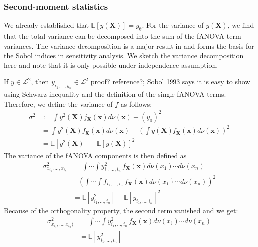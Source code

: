 \subsubsection*{Second-moment statistics}
We already established that $\mathbb{E}[y(\boldsymbol{X})] = y_{\emptyset}$.
For the variance of $y(\boldsymbol{X})$, we find that the total variance can be decomposed into the sum of the fANOVA term variances. The variance decomposition is a major result in \cite{sobol1993sensitivity} and forms the basis for the Sobol indices in sensitivity analysis. We sketch the variance decomposition here and note that it is only possible under independence assumption.\par
If $y \in \mathcal{L}^2$, then $y_{i_{1}, \dots, y_{n}} \in \mathcal{L}^2$ {\color{blue}proof? reference?; Sobol 1993 says it is easy to show using Schwarz inequality and the definition of the single fANOVA terms.}
Therefore, we define the variance of $f$ as follows:
\begin{align*}
    \sigma^2 &:= \int y^2(\boldsymbol{X}) f_{\boldsymbol{X}}(\boldsymbol{x}) d\nu (\boldsymbol{x}) - (y_0)^2 \\
    &= \int y^2(\boldsymbol{X}) f_{\boldsymbol{X}}(\boldsymbol{x}) d\nu (\boldsymbol{x}) - (\int y(\boldsymbol{X}) f_{\boldsymbol{X}}(\boldsymbol{x}) d\nu (\boldsymbol{x}))^2 \\
    &= \mathbb{E}[y^2(\boldsymbol{X})] - \mathbb{E}[y(\boldsymbol{X})]^2
    \label{variance_whole}
\end{align*}
The variance of the fANOVA components is then defined as
\begin{align*}
    \sigma^2_{x_{i_1}, \dots, x_{i_n}}
    &= \int \cdots \int y^2_{i_{1}, \dots, i_{n}} \, f_{\boldsymbol{X}}(\boldsymbol{x}) d\nu(x_1) \cdots d\nu(x_n) \\
    & - \left( \int \cdots \int f_{i_{1}, \dots, i_{n}} \, f_{\boldsymbol{X}}(\boldsymbol{x}) d\nu(x_1) \cdots d\nu(x_n) \right)^2\\
    &= \mathbb{E}[y^2_{i_{1}, \dots, i_{n}}] - \mathbb{E}[y_{i_{1}, \dots, i_{n}}]^2
\end{align*}
Because of the orthogonality property, the second term vanished and we get:
\begin{align*}
    \sigma^2_{x_{i_1}, \dots, x_{i_n})}
    &= \int \cdots \int y^2_{i_{1}, \dots, i_{n}} \, f_{\boldsymbol{X}}(\boldsymbol{x}) d\nu(x_1) \cdots d\nu(x_n)\\
    &= \mathbb{E}[y^2_{i_{1}, \dots, i_{n}}]
\end{align*}

